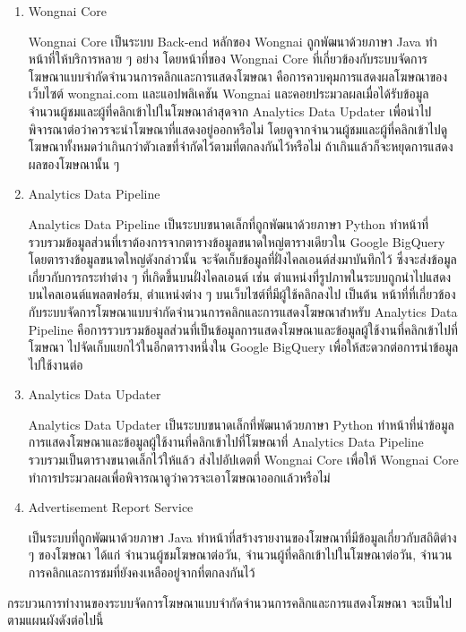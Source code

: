 \begin{enumerate}
	\item Wongnai Core
	
	Wongnai Core เป็นระบบ Back-end หลักของ Wongnai ถูกพัฒนาด้วยภาษา Java ทำหน้าที่ให้บริการหลาย ๆ อย่าง โดยหน้าที่ของ Wongnai Core ที่เกี่ยวข้องกับระบบจัดการโฆษณาแบบจำกัดจำนวนการคลิกและการแสดงโฆษณา คือการควบคุมการแสดงผลโฆษณาของเว็บไซต์ wongnai.com และแอปพลิเคชัน Wongnai และคอยประมวลผลเมื่อได้รับข้อมูลจำนวนผู้ชมและผู้ที่คลิกเข้าไปในโฆษณาล่าสุดจาก Analytics Data Updater เพื่อนำไปพิจารณาต่อว่าควรจะนำโฆษณาที่แสดงอยู่ออกหรือไม่ โดยดูจากจำนวนผู้ชมและผู้ที่คลิกเข้าไปดูโฆษณาทั้งหมดว่าเกินกว่าตัวเลขที่จำกัดไว้ตามที่ตกลงกันไว้หรือไม่ ถ้าเกินแล้วก็จะหยุดการแสดงผลของโฆษณานั้น ๆ
	
	\item Analytics Data Pipeline
	
	Analytics Data Pipeline เป็นระบบขนาดเล็กที่ถูกพัฒนาด้วยภาษา Python ทำหน้าที่รวบรวมข้อมูลส่วนที่เราต้องการจากตารางข้อมูลขนาดใหญ่ตารางเดียวใน Google BigQuery โดยตารางข้อมูลขนาดใหญ่ดังกล่าวนั้น จะจัดเก็บข้อมูลที่ฝั่งไคลเอนต์ส่งมาบันทึกไว้ ซึ่งจะส่งข้อมูลเกี่ยวกับการกระทำต่าง ๆ ที่เกิดขึ้นบนฝั่งไคลเอนต์ เช่น ตำแหน่งที่รูปภาพในระบบถูกนำไปแสดงบนไคลเอนต์แพลตฟอร์ม, ตำแหน่งต่าง ๆ บนเว็บไซต์ที่มีผู้ใช้คลิกลงไป เป็นต้น หน้าที่ที่เกี่ยวข้องกับระบบจัดการโฆษณาแบบจำกัดจำนวนการคลิกและการแสดงโฆษณาสำหรับ Analytics Data Pipeline คือการรวบรวมข้อมูลส่วนที่เป็นข้อมูลการแสดงโฆษณาและข้อมูลผู้ใช้งานที่คลิกเข้าไปที่โฆษณา ไปจัดเก็บแยกไว้ในอีกตารางหนึ่งใน Google BigQuery เพื่อให้สะดวกต่อการนำข้อมูลไปใช้งานต่อ
	
	\item Analytics Data Updater
	
	Analytics Data Updater เป็นระบบขนาดเล็กที่พัฒนาด้วยภาษา Python ทำหน้าที่นำข้อมูลการแสดงโฆษณาและข้อมูลผู้ใช้งานที่คลิกเข้าไปที่โฆษณาที่ Analytics Data Pipeline รวบรวมเป็นตารางขนาดเล็กไว้ให้แล้ว ส่งไปอัปเดตที่ Wongnai Core เพื่อให้ Wongnai Core ทำการประมวลผลเพื่อพิจารณาดูว่าควรจะเอาโฆษณาออกแล้วหรือไม่
	
	\item Advertisement Report Service
	
	เป็นระบบที่ถูกพัฒนาด้วยภาษา Java ทำหน้าที่สร้างรายงานของโฆษณาที่มีข้อมูลเกี่ยวกับสถิติต่าง ๆ ของโฆษณา ได้แก่ จำนวนผู้ชมโฆษณาต่อวัน, จำนวนผู้ที่คลิกเข้าไปในโฆษณาต่อวัน, จำนวนการคลิกและการชมที่ยังคงเหลืออยู่จากที่ตกลงกันไว้
\end{enumerate}

กระบวนการทำงานของระบบจัดการโฆษณาแบบจำกัดจำนวนการคลิกและการแสดงโฆษณา จะเป็นไปตามแผนผังดังต่อไปนี้